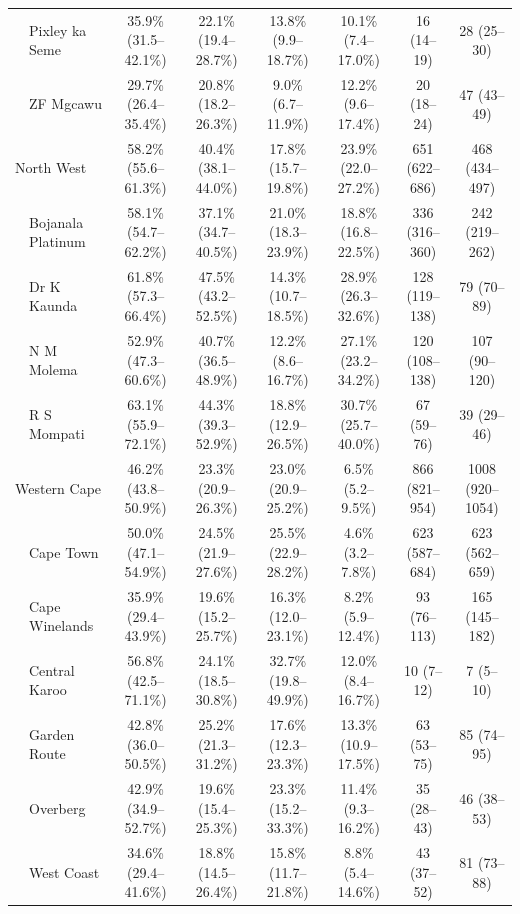 \documentclass{article}
\begin{document}
\begin{landscape}
{\begin{longtable}[c]{llc cc ccc}
      & Pixley ka Seme & 35.9\% (31.5--42.1\%) & 22.1\% (19.4--28.7\%) & 13.8\% (9.9--18.7\%) & 10.1\% (7.4--17.0\%) & 16 (14--19) & 28 (25--30) \\
      & ZF Mgcawu & 29.7\% (26.4--35.4\%) & 20.8\% (18.2--26.3\%) & 9.0\% (6.7--11.9\%) & 12.2\% (9.6--17.4\%) & 20 (18--24) & 47 (43--49) \\[5pt]
      \multicolumn{2}{l}{North West} & 58.2\% (55.6--61.3\%) & 40.4\% (38.1--44.0\%) & 17.8\% (15.7--19.8\%) & 23.9\% (22.0--27.2\%) & 651 (622--686) & 468 (434--497) \\
      & Bojanala Platinum & 58.1\% (54.7--62.2\%) & 37.1\% (34.7--40.5\%) & 21.0\% (18.3--23.9\%) & 18.8\% (16.8--22.5\%) & 336 (316--360) & 242 (219--262) \\
      & Dr K Kaunda & 61.8\% (57.3--66.4\%) & 47.5\% (43.2--52.5\%) & 14.3\% (10.7--18.5\%) & 28.9\% (26.3--32.6\%) & 128 (119--138) & 79 (70--89) \\
      & N M Molema & 52.9\% (47.3--60.6\%) & 40.7\% (36.5--48.9\%) & 12.2\% (8.6--16.7\%) & 27.1\% (23.2--34.2\%) & 120 (108--138) & 107 (90--120) \\
      & R S Mompati & 63.1\% (55.9--72.1\%) & 44.3\% (39.3--52.9\%) & 18.8\% (12.9--26.5\%) & 30.7\% (25.7--40.0\%) & 67 (59--76) & 39 (29--46) \\[5pt]
      \multicolumn{2}{l}{Western Cape} & 46.2\% (43.8--50.9\%) & 23.3\% (20.9--26.3\%) & 23.0\% (20.9--25.2\%) & 6.5\% (5.2--9.5\%) & 866 (821--954) & 1008 (920--1054) \\
      & Cape Town & 50.0\% (47.1--54.9\%) & 24.5\% (21.9--27.6\%) & 25.5\% (22.9--28.2\%) & 4.6\% (3.2--7.8\%) & 623 (587--684) & 623 (562--659) \\
      & Cape Winelands & 35.9\% (29.4--43.9\%) & 19.6\% (15.2--25.7\%) & 16.3\% (12.0--23.1\%) & 8.2\% (5.9--12.4\%) & 93 (76--113) & 165 (145--182) \\
      & Central Karoo & 56.8\% (42.5--71.1\%) & 24.1\% (18.5--30.8\%) & 32.7\% (19.8--49.9\%) & 12.0\% (8.4--16.7\%) & 10 (7--12) & 7 (5--10) \\
      & Garden Route & 42.8\% (36.0--50.5\%) & 25.2\% (21.3--31.2\%) & 17.6\% (12.3--23.3\%) & 13.3\% (10.9--17.5\%) & 63 (53--75) & 85 (74--95) \\
      & Overberg & 42.9\% (34.9--52.7\%) & 19.6\% (15.4--25.3\%) & 23.3\% (15.2--33.3\%) & 11.4\% (9.3--16.2\%) & 35 (28--43) & 46 (38--53) \\
      & West Coast & 34.6\% (29.4--41.6\%) & 18.8\% (14.5--26.4\%) & 15.8\% (11.7--21.8\%) & 8.8\% (5.4--14.6\%) & 43 (37--52) & 81 (73--88) 
      \label{tab:results}
  \end{longtable}
  }
\end{landscape}

\end{document}
